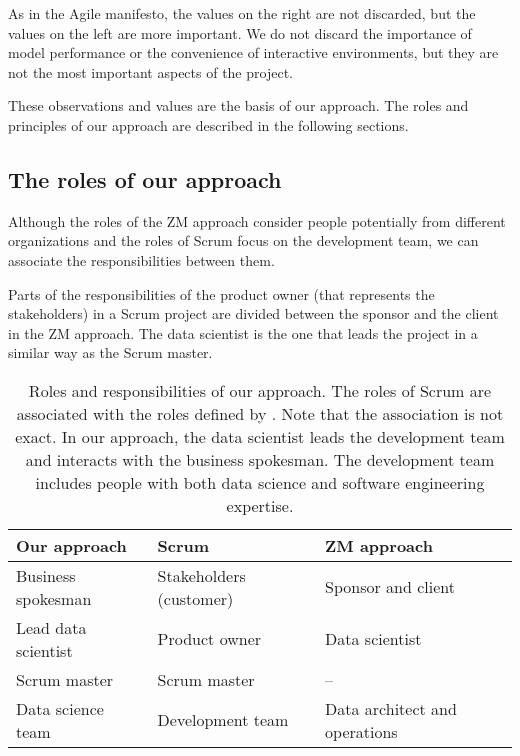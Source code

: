 As in the Agile manifesto, the values on the right are not discarded, but the values on the
left are more important.  We do not discard the importance of model performance or the
convenience of interactive environments, but they are not the most important aspects of the
project.

These observations and values are the basis of our approach.  The roles and principles of
our approach are described in the following sections.

\subsection{The roles of our approach}

Although the roles of the ZM approach consider people potentially from different
organizations and the roles of Scrum focus on the development team, we can associate the
responsibilities between them.

Parts of the responsibilities of the product owner (that represents the stakeholders) in a
Scrum project are divided between the sponsor and the client in the ZM approach.  The data
scientist is the one that leads the project in a similar way as the Scrum master.

\begin{table}
  \centering
  \begin{tabular}{>{\raggedright\arraybackslash}p{2.5cm}>{\raggedright\arraybackslash}p{2.5cm}>{\raggedright\arraybackslash}p{2.5cm}}
    \toprule
    \textbf{Our approach} & \textbf{Scrum} & \textbf{ZM approach} \\
    \midrule
    Business spokesman    & Stakeholders (customer) & Sponsor and client \\
    Lead data scientist   & Product owner           & Data scientist \\
    Scrum master          & Scrum master            & -- \\
    Data science team     & Development team        & Data architect and operations \\
    \bottomrule
  \end{tabular}
  \caption{
  Roles and responsibilities of our approach.
  The roles of Scrum are associated with the roles defined by \textcite{Zumel2019}.
  Note that the association is not exact.
  In our approach, the data scientist leads the development team and interacts with the
  business spokesman.  The development team includes people with both data science and software
  engineering expertise.
  }
  \label{tab:roles}
\end{table}

